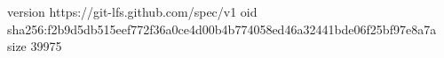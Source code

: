 version https://git-lfs.github.com/spec/v1
oid sha256:f2b9d5db515eef772f36a0ce4d00b4b774058ed46a32441bde06f25bf97e8a7a
size 39975
